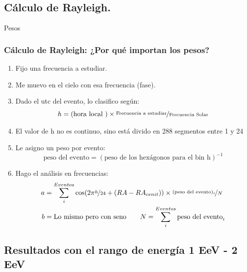 \documentclass{beamer}
\begin{document}
\subsection{Cálculo de Rayleigh.}

\begin{frame}{Pesos}
\frametitle{Cálculo de Rayleigh: ¿Por qué importan los pesos?}

 \begin{enumerate}
   \item Fijo una frecuencia a estudiar.
   \item Me muevo en el cielo con esa frecuencia (fase).
   \item Dado el utc del evento, lo clasifico según:
   \begin{equation*}
     h = (\text{hora local })\times \nicefrac{\text{Frecuencia a estudiar}}{\text{Frecuencia Solar}}
   \end{equation*}
     \item El valor de h no es continuo, sino está divido en 288 segmentos entre 1 y 24
  \item Le asigno un peso por evento:
   \begin{equation*}
     \text{peso del evento} = (\text{peso  de los hexágonos para el bin h})^{-1}
     \end{equation*} 
    \item Hago el análisis en frecuencias:
    \begin{align*}
        a &= \sum^{Eventos}_i \cos(2\pi \nicefrac{h}{24} + (RA -RA_{cenit}))\times \nicefrac{(\text{peso del evento})_i}{N}\\
        b &= \text{Lo mismo pero con seno}\qquad         N = \sum^{Eventos}_i \text{peso del evento}_i
    \end{align*}
 \end{enumerate}

\end{frame}



\subsection{Resultados con el rango de energía 1 EeV - 2 EeV}
\end{document}
